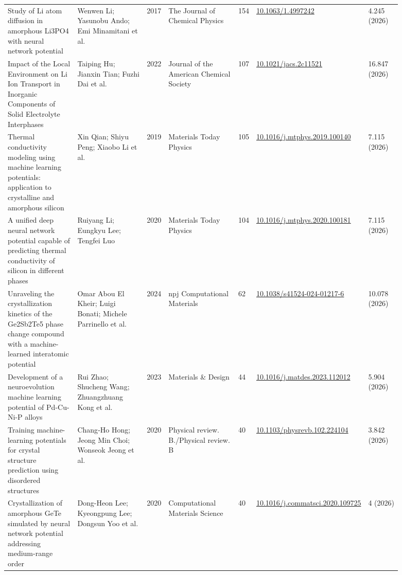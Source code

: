 \documentclass[10pt,a4paper]{article}
\begin{document}
{\begin{longtable}{p{0.192\linewidth}p{0.192\linewidth}p{0.043\linewidth}p{0.192\linewidth}p{0.043\linewidth}p{0.132\linewidth}p{0.096\linewidth}}
Study of Li atom diffusion in amorphous Li3PO4 with neural network potential & Wenwen Li; Yasunobu Ando; Emi Minamitani et al. & 2017 & The Journal of Chemical Physics & 154 & \href{https://doi.org/10.1063/1.4997242}{10.1063/1.4997242} & 4.245 (2026) \\
Impact of the Local Environment on Li Ion Transport in Inorganic Components of Solid Electrolyte Interphases & Taiping Hu; Jianxin Tian; Fuzhi Dai et al. & 2022 & Journal of the American Chemical Society & 107 & \href{https://doi.org/10.1021/jacs.2c11521}{10.1021/jacs.2c11521} & 16.847 (2026) \\
Thermal conductivity modeling using machine learning potentials: application to crystalline and amorphous silicon & Xin Qian; Shiyu Peng; Xiaobo Li et al. & 2019 & Materials Today Physics & 105 & \href{https://doi.org/10.1016/j.mtphys.2019.100140}{10.1016/j.mtphys.2019.100140} & 7.115 (2026) \\
A unified deep neural network potential capable of predicting thermal conductivity of silicon in different phases & Ruiyang Li; Eungkyu Lee; Tengfei Luo & 2020 & Materials Today Physics & 104 & \href{https://doi.org/10.1016/j.mtphys.2020.100181}{10.1016/j.mtphys.2020.100181} & 7.115 (2026) \\
Unraveling the crystallization kinetics of the Ge2Sb2Te5 phase change compound with a machine-learned interatomic potential & Omar Abou El Kheir; Luigi Bonati; Michele Parrinello et al. & 2024 & npj Computational Materials & 62 & \href{https://doi.org/10.1038/s41524-024-01217-6}{10.1038/s41524-024-01217-6} & 10.078 (2026) \\
Development of a neuroevolution machine learning potential of Pd-Cu-Ni-P alloys & Rui Zhao; Shucheng Wang; Zhuangzhuang Kong et al. & 2023 & Materials \& Design & 44 & \href{https://doi.org/10.1016/j.matdes.2023.112012}{10.1016/j.matdes.2023.112012} & 5.904 (2026) \\
Training machine-learning potentials for crystal structure prediction using disordered structures & Chang‐Ho Hong; Jeong Min Choi; Wonseok Jeong et al. & 2020 & Physical review. B./Physical review. B & 40 & \href{https://doi.org/10.1103/physrevb.102.224104}{10.1103/physrevb.102.224104} & 3.842 (2026) \\
Crystallization of amorphous GeTe simulated by neural network potential addressing medium-range order & Dong-Heon Lee; Kyeongpung Lee; Dongsun Yoo et al. & 2020 & Computational Materials Science & 40 & \href{https://doi.org/10.1016/j.commatsci.2020.109725}{10.1016/j.commatsci.2020.109725} & 4 (2026) \\

\end{longtable}}
\end{document}
